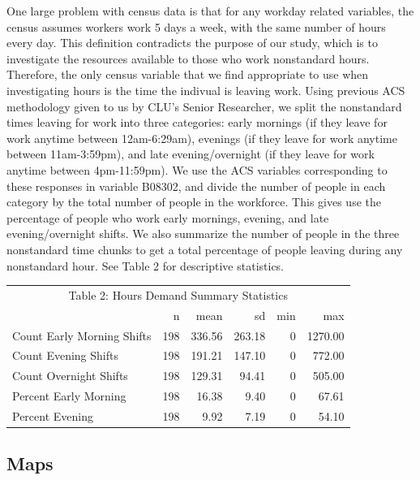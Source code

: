 \documentclass[10pt,letterpaper]{article}
\begin{document}
One large problem with census data is that for any workday related
variables, the census assumes workers work 5 days a week, with the same
number of hours every day. This definition contradicts the purpose of
our study, which is to investigate the resources available to those who
work nonstandard hours. Therefore, the only census variable that we find
appropriate to use when investigating hours is the time the indivual is
leaving work. Using previous ACS methodology given to us by CLU's Senior
Researcher, we split the nonstandard times leaving for work into three
categories: early mornings (if they leave for work anytime between
12am-6:29am), evenings (if they leave for work anytime between
11am-3:59pm), and late evening/overnight (if they leave for work anytime
between 4pm-11:59pm). We use the ACS variables corresponding to these
responses in variable B08302, and divide the number of people in each
category by the total number of people in the workforce. This gives use
the percentage of people who work early mornings, evening, and late
evening/overnight shifts. We also summarize the number of people in the
three nonstandard time chunks to get a total percentage of people
leaving during any nonstandard hour. See Table 2 for descriptive
statistics.

\begin{table}[!h]
\centering\begingroup\fontsize{10}{12}\selectfont

\begin{tabular}{l|r|r|r|r|r}
\hline
\multicolumn{6}{c|}{Table 2: Hours Demand Summary Statistics} \\
\cline{1-6}
  & n & mean & sd & min & max\\
\hline
\rowcolor{gray!6}  Count Early Morning Shifts & 198 & 336.56 & 263.18 & 0 & 1270.00\\
\hline
Count Evening Shifts & 198 & 191.21 & 147.10 & 0 & 772.00\\
\hline
\rowcolor{gray!6}  Count Overnight Shifts & 198 & 129.31 & 94.41 & 0 & 505.00\\
\hline
Percent Early Morning & 198 & 16.38 & 9.40 & 0 & 67.61\\
\hline
\rowcolor{gray!6}  Percent Evening & 198 & 9.92 & 7.19 & 0 & 54.10\\
\hline
\end{tabular}
\endgroup{}
\end{table}

\subsection{Maps}\label{maps-1}
\end{document}
